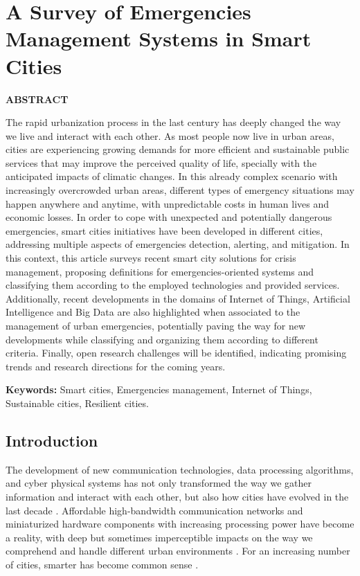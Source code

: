 \chapter{A Survey of Emergencies Management Systems in Smart Cities}\label{cap:survey}

\begin{refsection}

\textbf{ABSTRACT}

The rapid urbanization process in the last century has deeply changed the way we live and interact with each other. As most people now live in urban areas, cities are experiencing growing demands for more efficient and sustainable public services that may improve the perceived quality of life, specially with the anticipated impacts of climatic changes. In this already complex scenario with increasingly overcrowded urban areas, different types of emergency situations may happen anywhere and anytime, with unpredictable costs in human lives and economic losses. In order to cope with unexpected and potentially dangerous emergencies, smart cities initiatives have been developed in different cities, addressing multiple aspects of emergencies detection, alerting, and mitigation. In this context, this article surveys recent smart city solutions for crisis management, proposing definitions for emergencies-oriented systems and classifying them according to the employed technologies and provided services. Additionally, recent developments in the domains of Internet of Things, Artificial Intelligence and Big Data are also highlighted when associated to the management of urban emergencies, potentially paving the way for new developments while classifying and organizing them according to different criteria. Finally, open research challenges will be identified, indicating promising trends and research directions for the coming years.

\textbf{Keywords:} Smart cities, Emergencies management, Internet of Things, Sustainable cities, Resilient cities.

\section{Introduction}

The development of new communication technologies, data processing algorithms, and cyber physical systems has not only transformed the way we gather information and interact with each other, but also how cities have evolved in the last decade \cite{smartcities1,smartcities7}. Affordable high-bandwidth communication networks and miniaturized hardware components with increasing processing power have become a reality, with deep but sometimes imperceptible impacts on the way we comprehend and handle different urban environments \cite{smartcities2,smartcities3}. For an increasing number of cities, smarter has become common sense \cite{smartcities8}.


\end{refsection}
